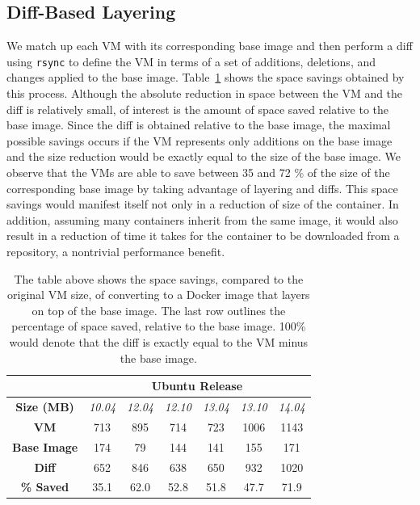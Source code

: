 \documentclass[\myfontsize, letterpaper]{article}
\begin{document}
\subsection{Diff-Based Layering}
We match up each VM with its corresponding base image and then perform a diff using \texttt{rsync} to define the VM in terms of a set of additions, deletions, and changes applied to the base image. Table~\ref{table:diff} shows the space savings obtained by this process. Although the absolute reduction in space between the VM and the diff is relatively small, of interest is the amount of space saved relative to the base image. Since the diff is obtained relative to the base image, the maximal possible savings occurs if the VM represents only additions on the base image and the size reduction would be exactly equal to the size of the base image. We observe that the VMs are able to save between 35 and 72 \% of the size of the corresponding base image by taking advantage of layering and diffs. This space savings would manifest itself not only in a reduction of size of the container. In addition, assuming many containers inherit from the same image, it would also result in a reduction of time it takes for the container to be downloaded from a repository, a nontrivial performance benefit.

\begin{table}[h]
\centering
    \begin{tabular}{| c | c | c | c | c | c | c |}
    \hline
& \multicolumn{6}{|c|}{\bfseries Ubuntu Release} \\ \hline
    \bfseries Size (MB) & \itshape 10.04 & \itshape 12.04 & \itshape 12.10 & \itshape 13.04 & \itshape 13.10 & \itshape 14.04 \\ \hline
    \bfseries VM & 713 &  895 & 714 & 723 & 1006 & 1143\\ \hline
    \bfseries Base Image & 174 & 79 & 144 & 141 & 155 & 171  \\ \hline
    \bfseries Diff & 652 & 846 & 638 & 650 & 932 & 1020\\ \hline \hline
    \bfseries \% Saved & 35.1 & 62.0 & 52.8 & 51.8 & 47.7 & 71.9\\
    \hline
    \end{tabular}
\caption{The table above shows the space savings, compared to the original VM size, of converting to a Docker image that layers on top of the base image. The last row outlines the percentage of space saved, relative to the base image. 100\% would denote that the diff is exactly equal to the VM minus the base image.}
\label{table:diff}
\end{table}
\end{document}
